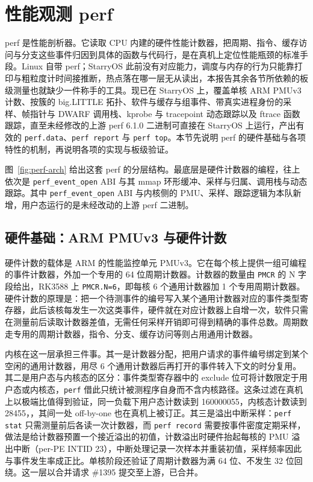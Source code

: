 \section{性能观测 perf}

perf 是性能剖析器。它读取 CPU 内建的硬件性能计数器，把周期、指令、缓存访问与分支这些事件归因到具体的函数与代码行，是在真机上定位性能瓶颈的标准手段。Linux 自带 perf；StarryOS 此前没有对应能力，调度与内存的行为只能靠打印与粗粒度计时间接推断，热点落在哪一层无从读出，本报告其余各节所依赖的板级测量也就缺少一件称手的工具。现已在 StarryOS 上，覆盖单核 ARM PMUv3 计数、按簇的 big.LITTLE 拓扑、软件与缓存与组事件、带真实进程身份的采样、帧指针与 DWARF 调用栈、kprobe 与 tracepoint 动态跟踪以及 ftrace 函数跟踪，直至未经修改的上游 perf 6.1.0 二进制可直接在 StarryOS 上运行，产出有效的 \texttt{perf.data}、\texttt{perf report} 与 \texttt{perf top}。本节先说明 perf 的硬件基础与各项特性的机制，再说明各项的实现与板级验证。


图~\ref{fig:perf-arch} 给出这套 perf 的分层结构。最底层是硬件计数器的编程，往上依次是 \texttt{perf\_event\_open} ABI 与其 mmap 环形缓冲、采样与归属、调用栈与动态跟踪。其中 \texttt{perf\_event\_open} ABI 与内核侧的 PMU、采样、跟踪逻辑为本队新增，用户态运行的是未经改动的上游 perf 二进制。

\subsection{硬件基础：ARM PMUv3 与硬件计数}

硬件计数的载体是 ARM 的性能监控单元 PMUv3。它在每个核上提供一组可编程的事件计数器，外加一个专用的 64 位周期计数器。计数器的数量由 \texttt{PMCR} 的 N 字段给出，RK3588 上 \texttt{PMCR.N=6}，即每核 6 个通用计数器加 1 个专用周期计数器。硬件计数的原理是：把一个待测事件的编号写入某个通用计数器对应的事件类型寄存器，此后该核每发生一次这类事件，硬件就在对应计数器上自增一次，软件只需在测量前后读取计数器差值，无需任何采样开销即可得到精确的事件总数。周期数走专用的周期计数器，指令、分支、缓存访问等则占用通用计数器。

内核在这一层承担三件事。其一是计数器分配，把用户请求的事件编号绑定到某个空闲的通用计数器，用尽 6 个通用计数器后再打开的事件转入下文的时分复用。其二是用户态与内核态的区分：事件类型寄存器中的 exclude 位可将计数限定于用户态或内核态，\texttt{perf} 借此只统计被测程序自身而不含内核路径。这条过滤在真机上以极端比值得到验证，同一负载下用户态计数读到 160000055，内核态计数读到 28455，，其间一处 off-by-one 也在真机上被订正。其三是溢出中断采样：\texttt{perf stat} 只需测量前后各读一次计数器，而 \texttt{perf record} 需要按事件密度定期采样，做法是给计数器预置一个接近溢出的初值，计数溢出时硬件抬起每核的 PMU 溢出中断（per-PE INTID 23），中断处理记录一次样本并重装初值，采样频率因此与事件发生率成正比。单核阶段还验证了周期计数器为满 64 位、不发生 32 位回绕。这一层以合并请求 \#1395 提交至上游，已合并。

